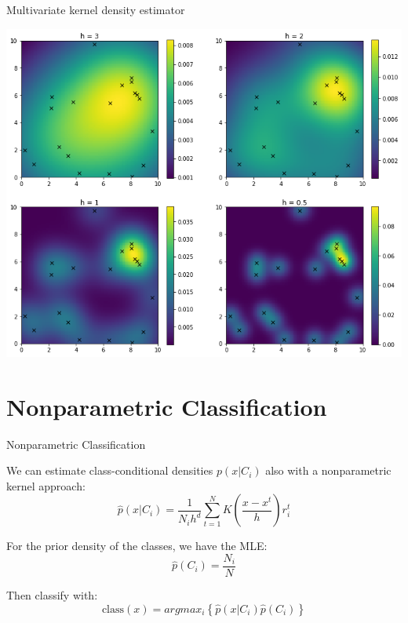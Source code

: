 \documentclass{beamer}
\begin{document}
\begin{frame}[fragile]{Multivariate kernel density estimator}
  \begin{center}
  \includegraphics[height=0.9\textheight]{images/multidddd.png}
  \end{center}
\end{frame}

\section{Nonparametric Classification}
\begin{frame}[fragile]{Nonparametric Classification}
  

We can estimate class-conditional densities $ p(x|C_{i})$ also with a nonparametric kernel approach:
	\begin{equation}
		\hat p(x|C_{i})=\frac{1}{N_{i}h^{d}}\sum^{N}_{t=1}K\left(\frac{x-x^{t}}{h}\right)r^{t}_{i}
	\end{equation} 	

For the prior density of the classes, we have the MLE:
\begin{equation}
  \hat p(C_i) = \frac{N_i}{N} 
\end{equation}

Then classify with:
\begin{equation}
  \text{class}(x) = argmax_i \left \{\hat p(x|C_i)\hat p(C_i) \right \}
\end{equation}
		
\end{frame}	
\end{document}
